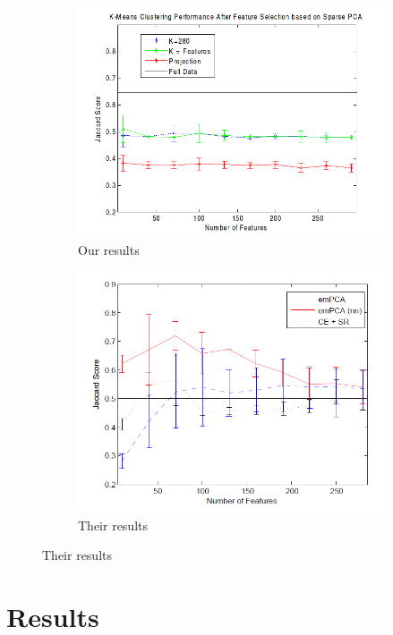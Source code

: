 \documentclass{article}
\begin{document}
\begin{figure}[H,width=\textwidth]
\caption{Variance versus cardinality for gene data}
\label{fig:jacard}
\begin{subfigure}{0.5\textwidth}
\caption{Our results}
\includegraphics[width=\textwidth]{8.png}
\end{subfigure}
\begin{subfigure}{0.5\textwidth}
\caption{Their results}
\includegraphics[width=\textwidth]{7.png}
\end{subfigure}
\end{figure}

\section{Results}
\end{document}
